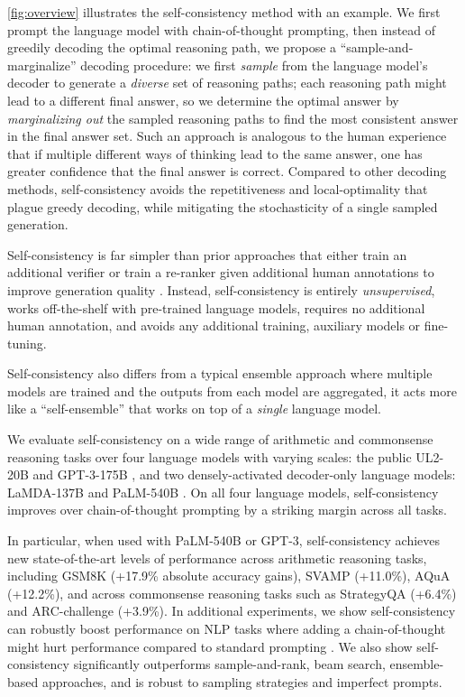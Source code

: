 \ref{fig:overview} illustrates the self-consistency method with an example. We first prompt the language model with chain-of-thought prompting, then instead of greedily decoding the optimal reasoning path, we propose a ``sample-and-marginalize'' decoding procedure: we first \textit{sample} from the language model's decoder to generate a \textit{diverse} set of reasoning paths; each reasoning path might lead to a different final answer, so we determine the optimal answer by \textit{marginalizing out} the sampled reasoning paths to find the most consistent answer in the final answer set. Such an approach is analogous to the human experience that if multiple different ways of thinking lead to the same answer, one has greater confidence that the final answer is correct. Compared to other decoding methods, self-consistency avoids the repetitiveness and local-optimality that plague greedy decoding, while mitigating the stochasticity of a single  sampled generation.

Self-consistency is far simpler than prior approaches that either train an additional verifier \citep{cobbe2021training} or train a re-ranker given additional human annotations to improve generation quality \citep{thoppilan2022lamda}. Instead, self-consistency is entirely \textit{unsupervised}, works off-the-shelf with pre-trained language models, requires no additional human annotation, and avoids any additional training, auxiliary models or fine-tuning.

Self-consistency also differs from a typical ensemble approach where multiple models are trained and the outputs from each model are aggregated, it acts more like a ``self-ensemble'' that works on top of a \textit{single} language model.

We evaluate self-consistency on a wide range of arithmetic and commonsense reasoning tasks over four language models with varying scales: the public UL2-20B \citep{ul2} and GPT-3-175B \citep{brown2020language}, and two densely-activated decoder-only language models: LaMDA-137B \citep{thoppilan2022lamda} and PaLM-540B \citep{palm}. On all four language models, self-consistency improves over chain-of-thought prompting by a striking margin across all tasks.

In particular, when used with PaLM-540B or GPT-3, self-consistency achieves new state-of-the-art levels of performance across arithmetic reasoning tasks, including GSM8K \citep{cobbe2021training} (+17.9\% absolute accuracy gains), SVAMP \citep{patel-etal-2021-nlp} (+11.0\%), AQuA \citep{ling-etal-2017-program} (+12.2\%), and across commonsense reasoning tasks such as StrategyQA \citep{geva-etal-2021-aristotle} (+6.4\%) and  ARC-challenge \citep{Clark2018ThinkYH} (+3.9\%).
In additional experiments, we show self-consistency can robustly boost performance on NLP tasks where adding a chain-of-thought might hurt performance compared to standard prompting \citep{ye2022unreliability}. We also show self-consistency significantly outperforms sample-and-rank, beam search, ensemble-based approaches, and is robust to sampling strategies and imperfect prompts.

